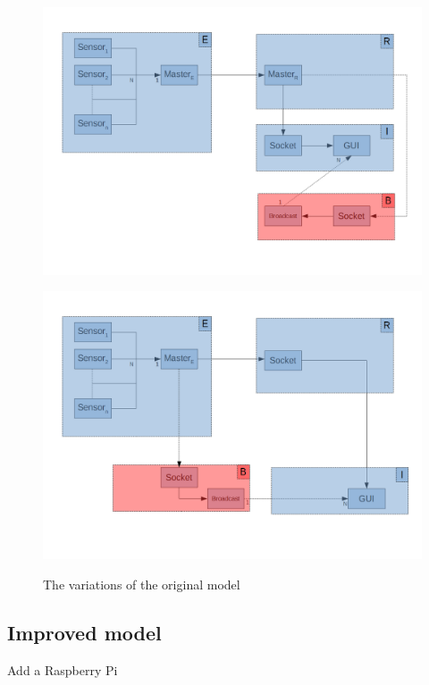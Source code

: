 \begin{figure}[H]
	\centering
	\begin{minipage}{.49\textwidth}
		\centering
		\includegraphics[width=\linewidth]{ERBI-Model-EtherCat}
		\label{fig:catmodel}
	\end{minipage}
	\begin{minipage}{.49\textwidth}
		\centering
		\includegraphics[width=\linewidth]{ERBI-Model-TCP}
		\label{fig:netmodel}
	\end{minipage}
	\caption{The variations of the original model}
	\label{fig:firstmodel}
\end{figure}

\subsection{Improved model}
Add a Raspberry Pi
